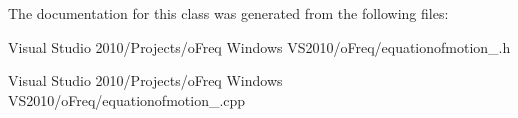 The documentation for this class was generated from the following files\-:\begin{DoxyCompactItemize}
\item 
Visual Studio 2010/\-Projects/o\-Freq Windows V\-S2010/o\-Freq/equationofmotion\-\_.\-h\item 
Visual Studio 2010/\-Projects/o\-Freq Windows V\-S2010/o\-Freq/equationofmotion\-\_.\-cpp\end{DoxyCompactItemize}
